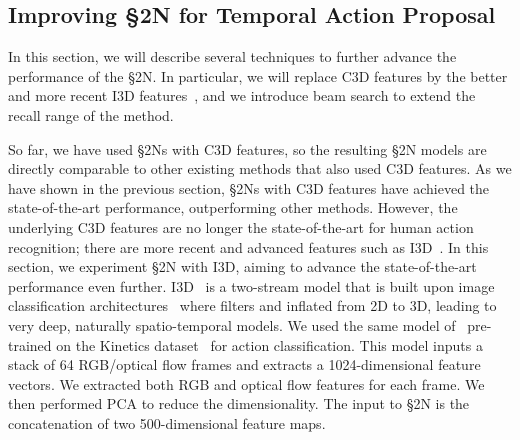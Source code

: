 \documentclass[10pt,journal,compsoc]{IEEEtran}
\begin{document}
\subsection{Improving \S2N for Temporal Action Proposal\label{sec:improved-S2N-exp}}

In this section, we will describe several techniques to further advance the performance of the \S2N. In particular, we will replace C3D features by the better and more recent I3D features~\cite{carreira2017quo}, and we introduce beam search to extend the recall range of the method.

 So far, we have used \S2Ns with C3D features, so the resulting \S2N models are directly comparable to other existing methods that also used C3D features. As we have shown in the previous section, \S2Ns with C3D features have achieved the state-of-the-art performance, outperforming other methods. However, the underlying C3D features are no longer the state-of-the-art for human action recognition; there are more recent and advanced features such as I3D~\cite{carreira2017quo}. In this section, we experiment \S2N with I3D, aiming to advance the state-of-the-art performance even further. I3D~\cite{carreira2017quo} is a two-stream model that is built upon image classification architectures~\cite{szegedy2015going} where filters and inflated from 2D to 3D, leading to very deep, naturally spatio-temporal models. We used the  same model of~\cite{carreira2017quo} pre-trained on the Kinetics dataset~\cite{kay2017kinetics} for action classification. This model inputs a stack of 64 RGB/optical flow frames and extracts a 1024-dimensional feature vectors. We extracted both RGB and optical flow features for each frame.  We then performed PCA to reduce the dimensionality. The input to \S2N is the concatenation of  two 500-dimensional feature maps. 

\end{document}
